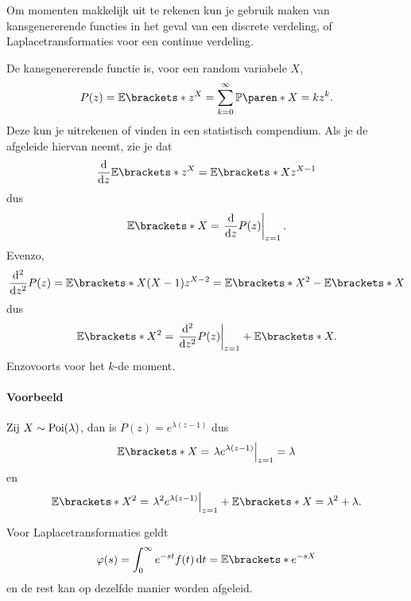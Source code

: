 Om momenten makkelijk uit te rekenen kun je gebruik maken van kansgenererende functies in het geval van een discrete verdeling, of Laplacetransformaties voor een continue verdeling.

De kansgenererende functie is, voor een random variabele $X$,
\[
    P(z) = \E{z^X} = \sum_{k=0}^\infty \P{X=k} z^k.
\]
Deze kun je uitrekenen of vinden in een statistisch compendium.
Als je de afgeleide hiervan neemt, zie je dat
\[
    \frac{\d}{\d z} \E{z^X} = \E{Xz^{X-1}}
\]
dus
\[
    \E{X} = \eval{\frac{\d}{\d z} P(z)}_{z=1}.
\]
Evenzo,
\[
    \frac{\d^2}{\d z^2} P(z) = \E{X(X-1)z^{X-2}} = \E{X^2} - \E{X}
\]
dus
\[
    \E{X^2} = \eval{\frac{\d^2}{\d z^2} P(z)}_{z=1} + \E{X}.
\]
Enzovoorts voor het $k$-de moment.

\paragraph{Voorbeeld}
Zij $X \sim \operatorname{Poi}(\lambda)$, dan is $P(z) = e^{\lambda (z-1)}$ dus
\[
    \E{X} = \eval{\lambda e^{\lambda (z-1)}}_{z=1} = \lambda
\]
en
\[
    \E{X^2} = \eval{\lambda^2 e^{\lambda (z-1)}}_{z=1} + \E{X} = \lambda^2 + \lambda .
\]

Voor Laplacetransformaties geldt
\[
    \phi(s) = \int_0^\infty e^{-st} f(t) \d t = \E{e^{-sX}}
\]
en de rest kan op dezelfde manier worden afgeleid.
